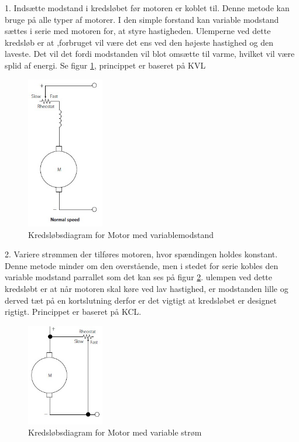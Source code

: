 1. Indsætte modstand i kredsløbet før motoren er koblet til.
Denne metode kan bruge på alle typer af motorer. I den simple forstand kan variable modstand sættes i serie med motoren for, at styre hastigheden. Ulemperne ved dette kredsløb er at ,forbruget vil være det ens ved den højeste hastighed og den laveste. Det vil det fordi modstanden vil blot omsætte til varme, hvilket vil være splid af energi. Se figur \ref{fig:motormodstand}, princippet er baseret på KVL

\begin{figure}[H]
	\centering
	\includegraphics[width=0.3\textwidth]{billeder/Hardware/motormodstand.jpg}
	\caption{Kredsløbsdiagram for Motor med variablemodstand}
	\label{fig:motormodstand}
\end{figure}

2. Variere strømmen der tilføres motoren, hvor spændingen holdes konstant.
Denne metode minder om den overstående, men i stedet for serie kobles den variable modstand parrallet som det kan ses på figur \ref{fig:motorcurrent}. ulempen ved dette kredsløbt er at når motoren skal køre ved lav hastighed, er modstanden lille og derved tæt på en kortslutning derfor er det vigtigt at kredsløbet er designet rigtigt. Princippet er baseret på KCL.

\begin{figure}[H]
	\centering
	\includegraphics[width=0.3\textwidth]{billeder/Hardware/motorcurrent.jpg}
	\caption{Kredsløbsdiagram for Motor med variable strøm}
	\label{fig:motorcurrent}
\end{figure}

